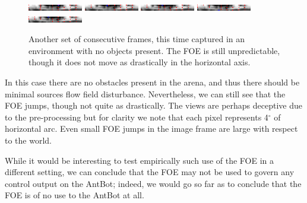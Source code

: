 \documentclass[a4paper,11pt,twoside,openright]{article}
\begin{document}
\begin{figure}[h!]
  \centering
  \includegraphics[width=\textwidth]{frame_00064}
  \includegraphics[width=\textwidth]{frame_00065}
  \includegraphics[width=\textwidth]{frame_00066}
  \includegraphics[width=\textwidth]{frame_00067}
  \includegraphics[width=\textwidth]{frame_00068}
  \caption{\label{fig:foeframesempty} Another set of consecutive
    frames, this time captured in an environment with no objects
    present. The FOE is still unpredictable, though it does not move
    as drastically in the horizontal axis.
  }
\end{figure}

In this case there are no obstacles present in the arena, and thus
there should be minimal sources flow field disturbance. Nevertheless,
we can still see that the FOE jumps, though not quite as drastically.
The views are perhaps deceptive due to the pre-processing but for
clarity we note that each pixel represents 4$^\circ$ of horizontal
arc. Even small FOE jumps in the image frame are large with respect to
the world.\newline\par

While it would be interesting to test empirically such use of the FOE
in a different setting, we can conclude that the FOE may not be used
to govern any control output on the AntBot; indeed, we would go so far
as to conclude that the FOE is of no use to the AntBot at all.
\newline\par
\end{document}
